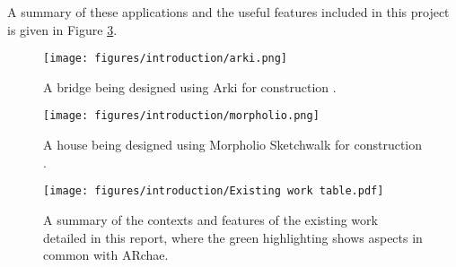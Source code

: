 \documentclass[12pt, a4paper]{article}
\begin{document}
A summary of these applications and the useful features included in this project is given in Figure \ref{fig:existingwork}.

\begin{figure}[H]
    \centering
    \texttt{[image: figures/introduction/arki.png]}
    \caption{A bridge being designed using Arki for construction \cite{existing:arki}.}
    \label{fig:arki}
\end{figure}

\begin{figure}[H]
    \centering
    \texttt{[image: figures/introduction/morpholio.png]}
    \caption{A house being designed using Morpholio Sketchwalk for construction \cite{existing:morpholio}.}
    \label{fig:morpholio}
\end{figure}

\begin{figure}[H]
    \centering
    \texttt{[image: figures/introduction/Existing work table.pdf]}
    \caption{A summary of the contexts and features of the existing work detailed in this report, where the green highlighting shows aspects in common with ARchae.}
    \label{fig:existingwork}
\end{figure}
\end{document}
